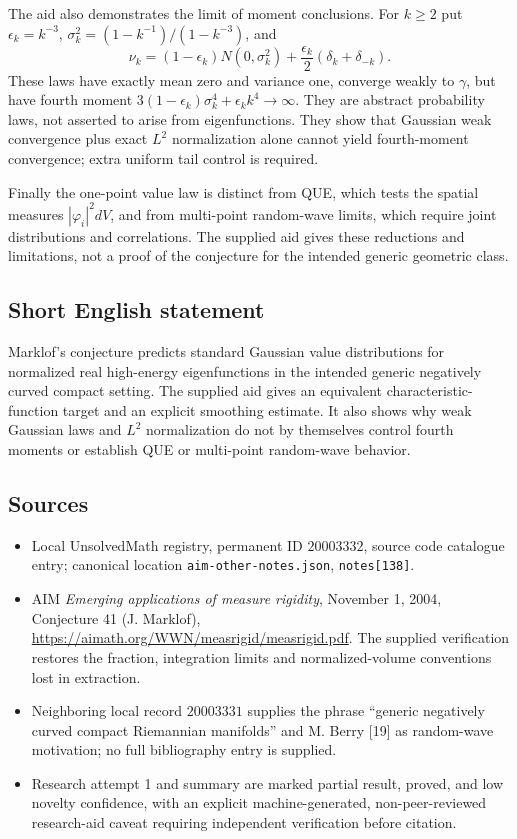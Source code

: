 \documentclass[11pt]{article}
\begin{document}
The aid also demonstrates the limit of moment conclusions. For $k\geq2$ put $\epsilon_k=k^{-3}$, $\sigma_k^2=(1-k^{-1})/(1-k^{-3})$, and
\[
 \nu_k=(1-\epsilon_k)N(0,\sigma_k^2)
          +\frac{\epsilon_k}{2}(\delta_k+\delta_{-k}).
\]
These laws have exactly mean zero and variance one, converge weakly to $\gamma$, but have fourth moment $3(1-\epsilon_k)\sigma_k^4+\epsilon_kk^4\to\infty$. They are abstract probability laws, not asserted to arise from eigenfunctions. They show that Gaussian weak convergence plus exact $L^2$ normalization alone cannot yield fourth-moment convergence; extra uniform tail control is required.

Finally the one-point value law is distinct from QUE, which tests the spatial measures $|\varphi_i|^2dV$, and from multi-point random-wave limits, which require joint distributions and correlations. The supplied aid gives these reductions and limitations, not a proof of the conjecture for the intended generic geometric class.
\subsection{Short English statement}
Marklof's conjecture predicts standard Gaussian value distributions for normalized real high-energy eigenfunctions in the intended generic negatively curved compact setting. The supplied aid gives an equivalent characteristic-function target and an explicit smoothing estimate. It also shows why weak Gaussian laws and $L^2$ normalization do not by themselves control fourth moments or establish QUE or multi-point random-wave behavior.
\subsection{Sources}
\begin{itemize}
\item Local UnsolvedMath registry, permanent ID $20003332$, source code catalogue entry; canonical location \texttt{aim-other-notes.json}, \texttt{notes[138]}.
\item AIM \emph{Emerging applications of measure rigidity}, November 1, 2004, Conjecture 41 (J. Marklof), \url{https://aimath.org/WWN/measrigid/measrigid.pdf}. The supplied verification restores the fraction, integration limits and normalized-volume conventions lost in extraction.
\item Neighboring local record $20003331$ supplies the phrase ``generic negatively curved compact Riemannian manifolds'' and M. Berry [19] as random-wave motivation; no full bibliography entry is supplied.
\item Research attempt 1 and summary are marked partial result, proved, and low novelty confidence, with an explicit machine-generated, non-peer-reviewed research-aid caveat requiring independent verification before citation.
\end{itemize}
\end{document}
